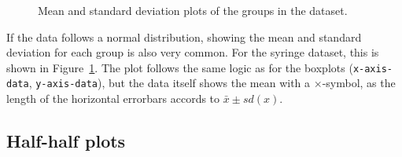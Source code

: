 \documentclass[
  a4paper,
]{scrbook}
\begin{document}
\begin{figure}[ht]


\caption{\label{fig-groups-mean-sd}Mean and standard deviation plots of
the groups in the dataset.}

\end{figure}%

If the data follows a normal distribution, showing the mean and standard
deviation for each group is also very common. For the syringe dataset,
this is shown in Figure~\ref{fig-groups-mean-sd}. The plot follows the
same logic as for the boxplots (\texttt{x-axis-data},
\texttt{y-axis-data}), but the data itself shows the mean with a
\(\times\)-symbol, as the length of the horizontal errorbars accords to
\(\bar{x} \pm sd(x)\).

\subsection{Half-half plots}\label{half-half-plots}
\end{document}
